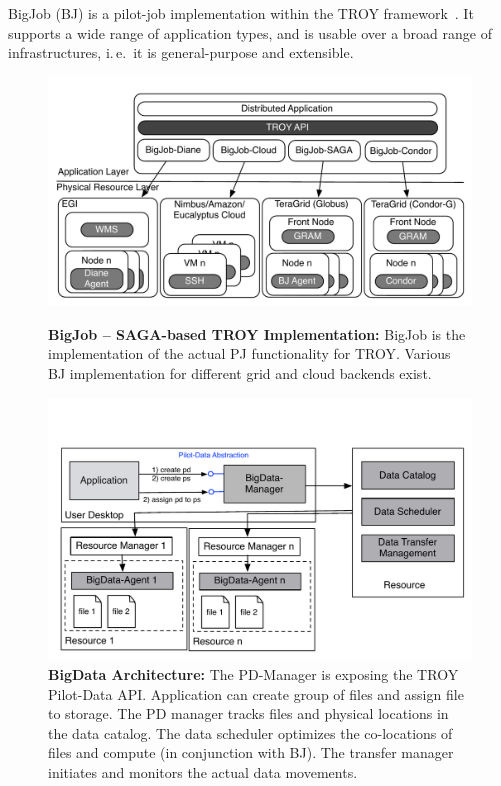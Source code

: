 \documentclass[conference,final]{IEEEtran}
\newcommand{\upp}{\vspace*{-0.5em}}
\begin{document}
BigJob (BJ) is a pilot-job implementation within the TROY
framework~\cite{bigjob_web}. It supports a wide range of application
types, and is usable over a broad range of infrastructures, i.\,e.\ it
is general-purpose and extensible.

\begin{figure}[t]
	\begin{minipage}[b]{0.475\linewidth}
	\centering
	\includegraphics[width=\textwidth]{figures/distributed_pilot_job.pdf}
	\caption{\textbf{BigJob -- SAGA-based TROY Implementation:} BigJob is the implementation of the actual PJ functionality for TROY. Various BJ implementation for different grid and cloud backends exist.}
	\label{fig:figures_distributed_pilot_job}
	\end{minipage}
	\hspace{0.035\linewidth}
	\begin{minipage}[b]{0.475\linewidth}
	\centering
   	\includegraphics[width=\textwidth]{figures/pilot-data-manager.pdf}
    \caption{\textbf{BigData Architecture:} The PD-Manager is exposing the 
	TROY Pilot-Data API. Application can create group of files and assign file
	to storage. The PD manager tracks files and physical locations in the data 
	catalog. The data scheduler optimizes the co-locations of files and compute 
	(in conjunction with BJ). The transfer manager initiates and monitors the 
	actual data movements. \upp\upp}
	\label{fig:pilot-data-architecture}
	\end{minipage}
\end{figure}
\end{document}

